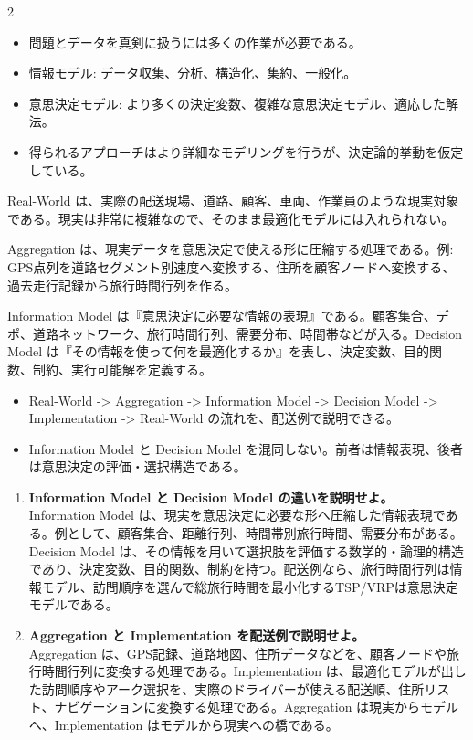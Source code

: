 \clearpage
{}
\begin{multicols}{2}\footnotesize\raggedcolumns
{}
\begin{itemize}
\item 問題とデータを真剣に扱うには多くの作業が必要である。
\item 情報モデル: データ収集、分析、構造化、集約、一般化。
\item 意思決定モデル: より多くの決定変数、複雑な意思決定モデル、適応した解法。
\item 得られるアプローチはより詳細なモデリングを行うが、決定論的挙動を仮定している。
\end{itemize}
Real-World は、実際の配送現場、道路、顧客、車両、作業員のような現実対象である。現実は非常に複雑なので、そのまま最適化モデルには入れられない。\par

Aggregation は、現実データを意思決定で使える形に圧縮する処理である。例: GPS点列を道路セグメント別速度へ変換する、住所を顧客ノードへ変換する、過去走行記録から旅行時間行列を作る。\par

Information Model は『意思決定に必要な情報の表現』である。顧客集合、デポ、道路ネットワーク、旅行時間行列、需要分布、時間帯などが入る。Decision Model は『その情報を使って何を最適化するか』を表し、決定変数、目的関数、制約、実行可能解を定義する。\par
{}
\begin{itemize}
\item Real-World -> Aggregation -> Information Model -> Decision Model -> Implementation -> Real-World の流れを、配送例で説明できる。
\item Information Model と Decision Model を混同しない。前者は情報表現、後者は意思決定の評価・選択構造である。
\end{itemize}
\begin{enumerate}
\item \textbf{Information Model と Decision Model の違いを説明せよ。}\\Information Model は、現実を意思決定に必要な形へ圧縮した情報表現である。例として、顧客集合、距離行列、時間帯別旅行時間、需要分布がある。Decision Model は、その情報を用いて選択肢を評価する数学的・論理的構造であり、決定変数、目的関数、制約を持つ。配送例なら、旅行時間行列は情報モデル、訪問順序を選んで総旅行時間を最小化するTSP/VRPは意思決定モデルである。
\item \textbf{Aggregation と Implementation を配送例で説明せよ。}\\Aggregation は、GPS記録、道路地図、住所データなどを、顧客ノードや旅行時間行列に変換する処理である。Implementation は、最適化モデルが出した訪問順序やアーク選択を、実際のドライバーが使える配送順、住所リスト、ナビゲーションに変換する処理である。Aggregation は現実からモデルへ、Implementation はモデルから現実への橋である。
\end{enumerate}
\end{multicols}

